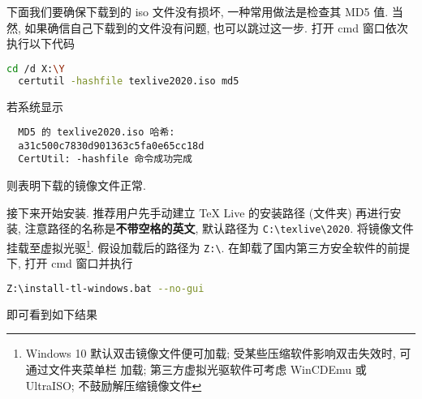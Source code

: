 下面我们要确保下载到的 iso 文件没有损坏, 一种常用做法是检查其 MD5 值.
当然, 如果确信自己下载到的文件没有问题, 也可以跳过这一步.
打开 \textsf{cmd} 窗口依次执行以下代码
\begin{lstlisting}[language = bash]
  cd /d X:\Y
  certutil -hashfile texlive2020.iso md5
\end{lstlisting}
若系统显示
\begin{lstlisting}
  MD5 的 texlive2020.iso 哈希:
  a31c500c7830d901363c5fa0e65cc18d
  CertUtil: -hashfile 命令成功完成
\end{lstlisting}
则表明下载的镜像文件正常.

接下来开始安装.
推荐用户先手动建立 \TeX{} Live 的安装路径 (文件夹) 再进行安装,
注意路径的名称是\textbf{不带空格的英文},
默认路径为 \texttt{C:\textbackslash texlive\textbackslash 2020}.
将镜像文件挂载至虚拟光驱\footnote{Windows 10 默认双击镜像文件便可加载;
受某些压缩软件影响双击失效时,
可通过文件夹菜单栏
 加载;
第三方虚拟光驱软件可考虑 WinCDEmu 或 UltraISO;
不鼓励解压缩镜像文件}. 
假设加载后的路径为 \texttt{Z:\textbackslash}.
在卸载了国内第三方安全软件的前提下,
打开 \textsf{cmd} 窗口并执行
\begin{lstlisting}[language = bash]
  Z:\install-tl-windows.bat --no-gui
\end{lstlisting}
即可看到如下结果
